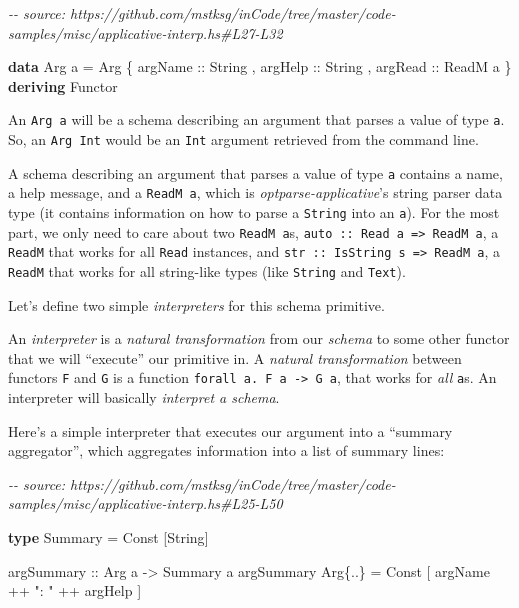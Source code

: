 \documentclass[]{article}
\newenvironment{Shaded}{}{}
\newcommand{\CommentTok}[1]{\textcolor[rgb]{0.38,0.63,0.69}{\textit{#1}}}
\newcommand{\DataTypeTok}[1]{\textcolor[rgb]{0.56,0.13,0.00}{#1}}
\newcommand{\KeywordTok}[1]{\textcolor[rgb]{0.00,0.44,0.13}{\textbf{#1}}}
\newcommand{\NormalTok}[1]{#1}
\newcommand{\OperatorTok}[1]{\textcolor[rgb]{0.40,0.40,0.40}{#1}}
\newcommand{\OtherTok}[1]{\textcolor[rgb]{0.00,0.44,0.13}{#1}}
\newcommand{\StringTok}[1]{\textcolor[rgb]{0.25,0.44,0.63}{#1}}
\begin{document}
\begin{Shaded}
\begin{Highlighting}[]
\CommentTok{{-}{-} source: https://github.com/mstksg/inCode/tree/master/code{-}samples/misc/applicative{-}interp.hs\#L27{-}L32}

\KeywordTok{data} \DataTypeTok{Arg}\NormalTok{ a }\OtherTok{=} \DataTypeTok{Arg}
\NormalTok{    \{}\OtherTok{ argName  ::} \DataTypeTok{String}
\NormalTok{    ,}\OtherTok{ argHelp  ::} \DataTypeTok{String}
\NormalTok{    ,}\OtherTok{ argRead  ::} \DataTypeTok{ReadM}\NormalTok{ a}
\NormalTok{    \}}
  \KeywordTok{deriving} \DataTypeTok{Functor}
\end{Highlighting}
\end{Shaded}

An \texttt{Arg\ a} will be a schema describing an argument that parses a value
of type \texttt{a}. So, an \texttt{Arg\ Int} would be an \texttt{Int} argument
retrieved from the command line.

A schema describing an argument that parses a value of type \texttt{a} contains
a name, a help message, and a \texttt{ReadM\ a}, which is
\emph{optparse-applicative}'s string parser data type (it contains information
on how to parse a \texttt{String} into an \texttt{a}). For the most part, we
only need to care about two \texttt{ReadM\ a}s,
\texttt{auto\ ::\ Read\ a\ =\textgreater{}\ ReadM\ a}, a \texttt{ReadM} that
works for all \texttt{Read} instances, and
\texttt{str\ ::\ IsString\ s\ =\textgreater{}\ ReadM\ a}, a \texttt{ReadM} that
works for all string-like types (like \texttt{String} and \texttt{Text}).

Let's define two simple \emph{interpreters} for this schema primitive.

An \emph{interpreter} is a \emph{natural transformation} from our \emph{schema}
to some other functor that we will ``execute'' our primitive in. A \emph{natural
transformation} between functors \texttt{F} and \texttt{G} is a function
\texttt{forall\ a.\ F\ a\ -\textgreater{}\ G\ a}, that works for \emph{all}
\texttt{a}s. An interpreter will basically \emph{interpret a schema}.

Here's a simple interpreter that executes our argument into a ``summary
aggregator'', which aggregates information into a list of summary lines:

\begin{Shaded}
\begin{Highlighting}[]
\CommentTok{{-}{-} source: https://github.com/mstksg/inCode/tree/master/code{-}samples/misc/applicative{-}interp.hs\#L25{-}L50}

\KeywordTok{type} \DataTypeTok{Summary} \OtherTok{=} \DataTypeTok{Const}\NormalTok{ [}\DataTypeTok{String}\NormalTok{]}

\OtherTok{argSummary ::} \DataTypeTok{Arg}\NormalTok{ a }\OtherTok{{-}>} \DataTypeTok{Summary}\NormalTok{ a}
\NormalTok{argSummary }\DataTypeTok{Arg}\NormalTok{\{}\OperatorTok{..}\NormalTok{\} }\OtherTok{=} \DataTypeTok{Const}\NormalTok{ [ argName }\OperatorTok{++} \StringTok{": "} \OperatorTok{++}\NormalTok{ argHelp ]}
\end{Highlighting}
\end{Shaded}
\end{document}
